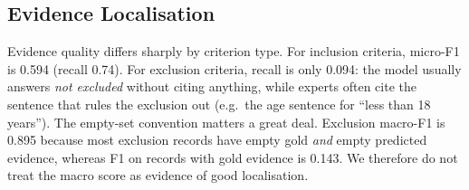 \documentclass[conference]{IEEEtran}
\begin{document}
\subsection{Evidence Localisation}
Evidence quality differs sharply by criterion type. For inclusion criteria, micro-F1 is 0.594 (recall 0.74). For exclusion criteria, recall is only 0.094: the model usually answers \emph{not excluded} without citing anything, while experts often cite the sentence that rules the exclusion out (e.g.\ the age sentence for ``less than 18 years''). The empty-set convention matters a great deal. Exclusion macro-F1 is 0.895 because most exclusion records have empty gold \emph{and} empty predicted evidence, whereas F1 on records with gold evidence is 0.143. We therefore do not treat the macro score as evidence of good localisation.
\end{document}

